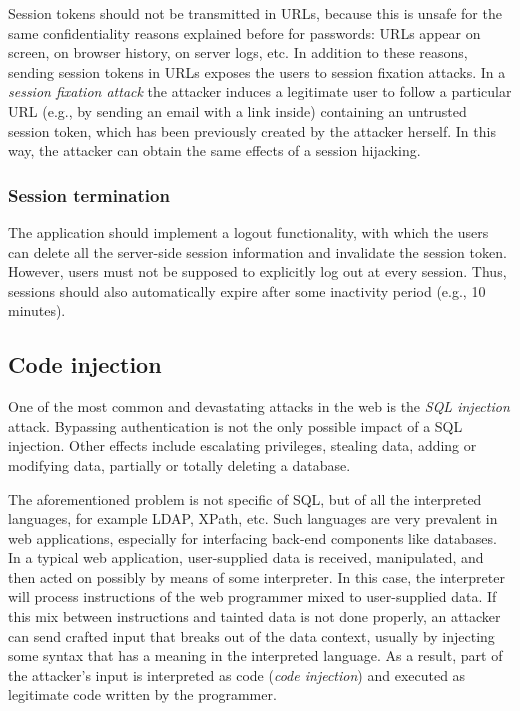 \documentclass[a4paper,12pt]{article}
\begin{document}
Session tokens should not be transmitted in URLs, because this is unsafe for the same confidentiality reasons explained before for passwords: URLs appear on screen, on browser history, on server logs, etc. In addition to these reasons, sending session tokens in URLs exposes the users to session fixation attacks. In a \textit{session fixation attack} the attacker induces a legitimate user to follow a particular URL (e.g., by sending an email with a link inside) containing an untrusted session token, which has been previously created by the attacker herself. In this way, the attacker can obtain the same effects of a session hijacking.

\subsubsection{Session termination}
The application should implement a logout functionality, with which the users can delete all the server-side session information and invalidate the session token. However, users must not be supposed to explicitly log out at every session. Thus, sessions should also automatically expire after some inactivity period (e.g., 10 minutes).

\subsection{Code injection}
One of the most common and devastating attacks in the web is the \textit{SQL injection} attack. Bypassing authentication is not the only possible impact of a SQL injection. Other effects include escalating privileges, stealing data, adding or modifying data, partially or totally deleting a database.

The aforementioned problem is not specific of SQL, but of all the interpreted languages, for example LDAP, XPath, etc. Such languages are very prevalent in web applications, especially for interfacing back-end components like databases. In a typical web application, user-supplied data is received, manipulated, and then acted on possibly by means of some interpreter. In this case, the interpreter will process instructions of the web programmer mixed to user-supplied data. If this mix between instructions and tainted data is not done properly, an attacker can send crafted input that breaks out of the data context, usually by injecting some syntax that has a meaning in the interpreted language. As a result, part of the attacker’s input is interpreted as code (\textit{code injection}) and executed as legitimate code written by the programmer.
\end{document}
